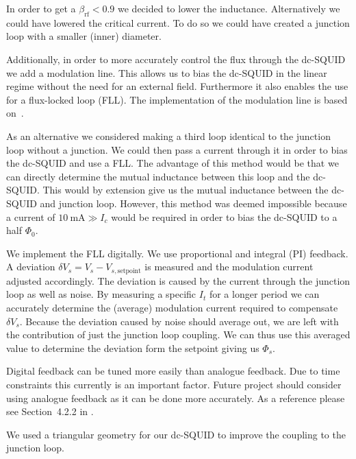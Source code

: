In order to get a $\beta_{\text{rf}} < 0.9$ we decided to lower the inductance. Alternatively we could have lowered the critical current. To do so we could have created a junction loop with a smaller (inner) diameter. 

Additionally, in order to more accurately control the flux through the dc-SQUID we add a modulation line. This allows us to bias the dc-SQUID in the linear regime without the need for an external field. Furthermore it also enables the use for a flux-locked loop (FLL). The implementation of the modulation line is based on~\cite{linYBaCuNano2020}.

As an alternative we considered making a third loop identical to the junction loop without a junction. We could then pass a current through it in order to bias the dc-SQUID and use a FLL. The advantage of this method would be that we can directly determine the mutual inductance between this loop and the dc-SQUID. This would by extension give us the mutual inductance between the dc-SQUID and junction loop. However, this method was deemed impossible because a current of $\qty{10}{\milli\ampere} \gg I_c$ would be required in order to bias the dc-SQUID to a half $\Phi_0$.

We implement the FLL digitally. We use proportional and integral (PI) feedback. A deviation $\delta V_s = V_s - V_{s,\text{setpoint}}$ is measured and the modulation current adjusted accordingly. The deviation is caused by the current through the junction loop as well as noise. By measuring a specific $I_t$ for a longer period we can accurately determine the (average) modulation current required to compensate $\delta V_s$. Because the deviation caused by noise should average out, we are left with the contribution of just the junction loop coupling. We can thus use this averaged value to determine the deviation form the setpoint giving us $\Phi_s$.

Digital feedback can be tuned more easily than analogue feedback. Due to time constraints this currently is an important factor. Future project should consider using analogue feedback as it can be done more accurately. As a reference please see Section~4.2.2 in \cite{zhangSQUIDReadoutElectronics2020}.

We used a triangular geometry for our dc-SQUID to improve the coupling to the junction loop.

